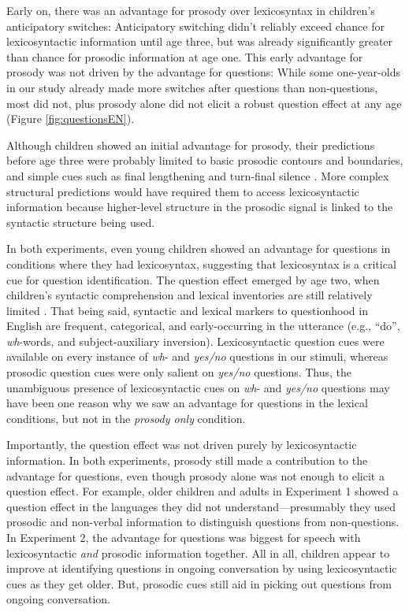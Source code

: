 \documentclass[authoryear, 12pt]{elsarticle}
\begin{document}
Early on, there was an advantage for prosody over lexicosyntax in children's anticipatory switches: Anticipatory switching didn't reliably exceed chance for lexicosyntactic information  until age three, but was already significantly greater than chance for prosodic information  at age one. This early advantage for prosody was not driven by the advantage for questions: While some one-year-olds in our study already made more switches after questions than non-questions, most did not, plus prosody alone did not elicit a robust question effect at any age (Figure \ref{fig:questionsEN}).

Although children showed an initial advantage for prosody, their predictions before age three were probably limited to basic prosodic contours and boundaries, and simple cues such as final lengthening and turn-final silence \citep{pannekamp2006}. More complex structural predictions would have required them to access lexicosyntactic information because higher-level structure in the prosodic signal is linked to the syntactic structure being used.

In both experiments, even young children showed an advantage for questions in conditions where they had lexicosyntax, suggesting that lexicosyntax is a critical cue for question identification. The question effect emerged by age two, when children's syntactic comprehension and lexical inventories are still relatively limited \citep{clark2009}. That being said, syntactic and lexical markers to questionhood in English are frequent, categorical, and early-occurring in the utterance (e.g., ``do'', \textit{wh}-words, and subject-auxiliary inversion). Lexicosyntactic question cues were available on every instance of \textit{wh}- and \textit{yes/no} questions in our stimuli, whereas prosodic question cues were only salient on \textit{yes/no} questions. Thus, the unambiguous presence of lexicosyntactic cues on \textit{wh}- and \textit{yes/no} questions may have been one reason why we saw an advantage for questions in the lexical conditions, but not in the \textit{prosody only} condition.

Importantly, the question effect was not driven purely by lexicosyntactic information. In both experiments, prosody still made a contribution to the advantage for questions, even though prosody alone was not enough to elicit a question effect. For example, older children and adults in Experiment 1 showed a question effect in the languages they did not understand---presumably they used prosodic and non-verbal information to distinguish questions from non-questions. In Experiment 2, the advantage for questions was biggest for speech with lexicosyntactic \textit{and} prosodic information together. All in all, children appear to improve at identifying questions in ongoing conversation by using lexicosyntactic cues as they get older. But, prosodic cues still aid in picking out questions from ongoing conversation.
\end{document}

